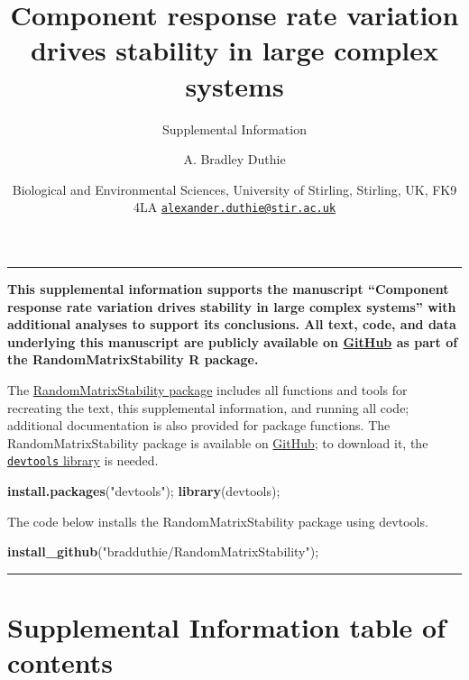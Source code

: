 \documentclass[]{article}
\title{Component response rate variation drives stability in large complex
systems}
\subtitle{Supplemental Information}
\author{A. Bradley Duthie}
\date{Biological and Environmental Sciences, University of Stirling, Stirling,
UK, FK9 4LA
\href{mailto:alexander.duthie@stir.ac.uk}{\nolinkurl{alexander.duthie@stir.ac.uk}}}
\newenvironment{Shaded}{\begin{snugshade}}{\end{snugshade}}
\newcommand{\KeywordTok}[1]{\textcolor[rgb]{0.13,0.29,0.53}{\textbf{{#1}}}}
\newcommand{\StringTok}[1]{\textcolor[rgb]{0.31,0.60,0.02}{{#1}}}
\newcommand{\NormalTok}[1]{{#1}}
\begin{document}
\maketitle

\begin{center}\rule{0.5\linewidth}{\linethickness}\end{center}

\textbf{This supplemental information supports the manuscript
``Component response rate variation drives stability in large complex
systems'' with additional analyses to support its conclusions. All text,
code, and data underlying this manuscript are publicly available on
\href{https://github.com/bradduthie/RandomMatrixStability}{GitHub} as
part of the RandomMatrixStability R package.}

The
\href{https://github.com/bradduthie/RandomMatrixStability}{RandomMatrixStability
package} includes all functions and tools for recreating the text, this
supplemental information, and running all code; additional documentation
is also provided for package functions. The RandomMatrixStability
package is available on
\href{https://github.com/bradduthie/RandomMatrixStability}{GitHub}; to
download it, the
\href{https://cran.r-project.org/web/packages/devtools/index.html}{\texttt{devtools}
library} is needed.

\begin{Shaded}
\begin{Highlighting}[]
\KeywordTok{install.packages}\NormalTok{(}\StringTok{"devtools"}\NormalTok{);}
\KeywordTok{library}\NormalTok{(devtools);}
\end{Highlighting}
\end{Shaded}

The code below installs the RandomMatrixStability package using
devtools.

\begin{Shaded}
\begin{Highlighting}[]
\KeywordTok{install_github}\NormalTok{(}\StringTok{"bradduthie/RandomMatrixStability"}\NormalTok{);}
\end{Highlighting}
\end{Shaded}

\begin{center}\rule{0.5\linewidth}{\linethickness}\end{center}

\section{Supplemental Information table of
contents}\label{supplemental-information-table-of-contents}
\end{document}
